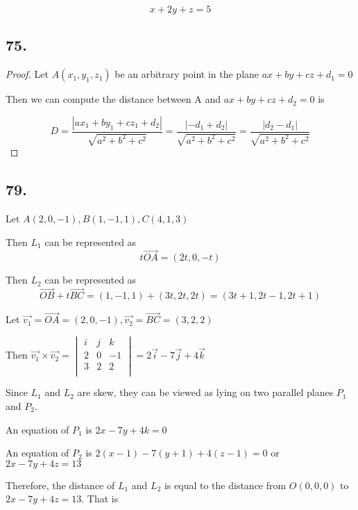 \documentclass{article}
\begin{document}
    $$x + 2y + z = 5$$

    \subsection*{75.}

    \begin{proof}

        Let $A(x_1, y_1, z_1)$ be an arbitrary point in the plane $ax+by+cz+d_1=0$

        Then we can compute the distance between A and $ax+by+cz+d_2=0$ is 

        $$D = \frac{|ax_1 + by_1 + cz_1 + d_2|}{\sqrt{a^2 + b^2 + c^2}} = \frac{|-d_1 + d_2|}{\sqrt{a^2 + b^2 + c^2}} = \frac{|d_2 - d_1|}{\sqrt{a^2 + b^2 + c^2}}$$
        
    \end{proof}

    \subsection*{79.}

    Let $A(2, 0, -1), B(1, -1, 1), C(4, 1, 3)$

    Then $L_1$ can be represented as $$t\overrightarrow{OA} = (2t, 0, -t)$$

    Then $L_2$ can be represented as $$\overrightarrow{OB} + t\overrightarrow{BC} = (1, -1, 1) + (3t, 2t, 2t) = (3t + 1, 2t - 1, 2t + 1)$$

    Let $\overrightarrow{v_1} = \overrightarrow{OA} = (2, 0, -1), \overrightarrow{v_2} = \overrightarrow{BC} = (3, 2, 2)$

    Then $\overrightarrow{v_1} \times \overrightarrow{v_2} = \begin{vmatrix}
        i & j & k \\
        2 & 0 & -1 \\
        3 & 2 & 2 \\
    \end{vmatrix} = 2\overrightarrow{i} - 7\overrightarrow{j} + 4\overrightarrow{k}$

    Since $L_1$ and $L_2$ are skew, they can be viewed as lying on two parallel planes $P_1$ and $P_2$.

    An equation of $P_1$ is $2x -7y + 4k = 0$

    An equation of $P_2$ is $2(x - 1) - 7(y + 1) + 4(z - 1) = 0$ or $2x - 7y + 4z = 13$

    Therefore, the distance of $L_1$ and $L_2$ is equal to the distance from $O(0, 0, 0)$ to $2x - 7y + 4z = 13$. That is
\end{document}
